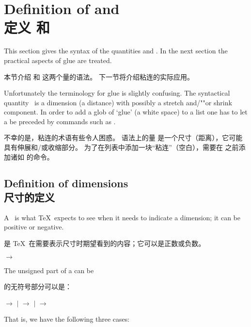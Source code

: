 \section{Definition of  and \\定义  和 }

This section gives
the syntax of the quantities
 and . 
In the next section the practical aspects of glue are treated.

本节介绍  和  这两个量的语法。
下一节将介绍粘连的实际应用。

Unfortunately the terminology for glue is slightly confusing.
The syntactical quantity~ is a dimension (a distance) with
\mdqon
possibly a stretch and/""or shrink component.
\mdqoff
In order to add a glob of `glue' (a white space) to a list one has to
let a  be preceded by commands such as .

不幸的是，粘连的术语有些令人困惑。
语法上的量  是一个尺寸（距离），\mdqon 它可能具有伸展和/或收缩部分。\mdqoff
为了在列表中添加一块“粘连”（空白），需要在  之前添加诸如  的命令。

\subsection{Definition of dimensions\\尺寸的定义}

A~ is what \TeX\ expects to see when
it needs to indicate a dimension; it can be positive or negative.

 是 \TeX\ 在需要表示尺寸时期望看到的内容；它可以是正数或负数。
\begin{disp} $\longrightarrow$ %
     \end{disp}
The unsigned part of a  can be

 的无符号部分可以是：
\begin{disp} $\longrightarrow$ 
     $|$ \nl
      $\longrightarrow$ 
     $|$ \nl
      $\longrightarrow$ 
     \end{disp}
That is, we have the following three cases:

